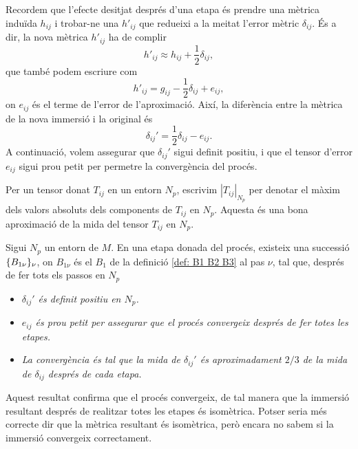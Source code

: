 Recordem que l'efecte desitjat després d'una etapa és prendre una mètrica induïda $h_{ij}$ i trobar-ne una $h'_{ij}$ que redueixi a la meitat l'error mètric $\delta_{ij}$. És a dir, la nova mètrica $h'_{ij}$ ha de complir
\begin{equation*}
    h'_{ij} \approx h_{ij} + \frac12\delta_{ij},
\end{equation*}
que també podem escriure com 
\begin{equation*}
    h'_{ij} = g_{ij} - \frac12\delta_{ij} + e_{ij},
\end{equation*}
on $e_{ij}$ és el terme de l'error de l'aproximació. Així, la diferència entre la mètrica de la nova immersió i la original és
\begin{equation}\label{eq:delta_prima}
    \delta_{ij}' = \frac12\delta_{ij} - e_{ij}.
\end{equation}
A continuació, volem assegurar que $\delta_{ij}'$ sigui definit positiu, i que el tensor d'error $e_{ij}$ sigui prou petit per permetre la convergència del procés.
\begin{nota}
    Per un tensor donat $T_{ij}$ en un entorn $N_p$, escrivim $|T_{ij}|_{N_p}$ per denotar el màxim dels valors absoluts dels components de $T_{ij}$ en $N_p$. Aquesta és una bona aproximació de la mida del tensor $T_{ij}$ en $N_p$.
\end{nota}
\begin{prop}\label{prop:dos de tres}
    Sigui $N_p$ un entorn de $M$. En una etapa donada del procés, existeix una successió $\{B_{1\nu}\}_{\nu}$, on $B_{1\nu}$ és el $B_1$ de la definició \ref{def: B1 B2 B3} al pas $\nu$, tal que, després de fer tots els passos en $N_p$
\end{prop}
\begin{itemize}
    \item \textit{$\delta_{ij}'$ és definit positiu en $N_p$.}
    \item \textit{$e_{ij}$ és prou petit per assegurar que el procés convergeix després de fer totes les etapes.}
    \item \textit{La convergència és tal que la mida de $\delta_{ij}'$ és aproximadament $2/3$ de la mida de $\delta_{ij}$ després de cada etapa. }
\end{itemize}
\begin{obs}
    Aquest resultat confirma que el procés convergeix, de tal manera que la immersió resultant després de realitzar totes les etapes és isomètrica. {\color{blue} Potser seria més correcte dir que la mètrica resultant és isomètrica, però encara no sabem si la immersió convergeix correctament.}
\end{obs}
